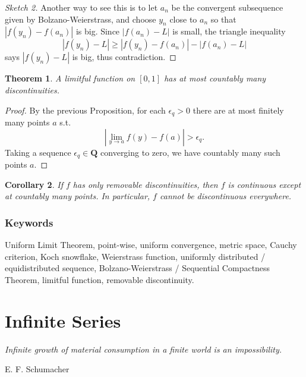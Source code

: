 \documentclass[12pt]{article}
\theoremstyle{plain}
\newtheorem{theorem}{Theorem}
\newtheorem{corollary}[theorem]{Corollary}
\theoremstyle{definition}
\theoremstyle{remark}
\newcommand{\Q}{\mathbf Q}
\begin{document}
\begin{proof}[Sketch 2]
Another way to see this is to let $a_n$ be the convergent subsequence given by Bolzano-Weierstrass, and choose $y_n$ close to $a_n$ so that $|f(y_n) - f(a_n)|$ is big. Since $|f(a_n) - L|$ is small, the triangle inequality
$$|f(y_n) - L| \geq |f(y_n) - f(a_n)| - |f(a_n) - L|$$
says $|f(y_n) - L|$ is big, thus contradiction.
\end{proof}

\begin{theorem}
A limitful function on $[0, 1]$ has at most countably many discontinuities.
\end{theorem}

\begin{proof}
By the previous Proposition, for each $\epsilon_q > 0$ there are at most finitely many points $a$ s.t. $$|\lim\limits_{y\to a} f(y) - f(a)| > \epsilon_q.$$ Taking a sequence $\epsilon_q \in \Q$ converging to zero, we have countably many such points $a$.
\end{proof}

\begin{corollary}
If $f$ has only removable discontinuities, then $f$ is continuous except at countably many points. In particular, $f$ cannot be discontinuous everywhere.
\end{corollary}

\section{Keywords}

Uniform Limit Theorem, point-wise, uniform convergence, metric space, Cauchy criterion, Koch snowflake, Weierstrass function, uniformly distributed / equidistributed sequence, Bolzano-Weierstrass / Sequential Compactness Theorem, limitful function, removable discontinuity.

\part{Infinite Series}

\epigraph{\textit{Infinite growth of material consumption in a finite world is an impossibility.}}{E. F. Schumacher}
\end{document}

